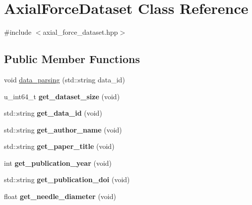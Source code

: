 \hypertarget{classAxialForceDataset}{}\section{Axial\+Force\+Dataset Class Reference}
\label{classAxialForceDataset}


{\ttfamily \#include $<$axial\+\_\+force\+\_\+dataset.\+hpp$>$}

\subsection*{Public Member Functions}
\begin{DoxyCompactItemize}
\item 
void \hyperlink{classAxialForceDataset_a603fe9e768304f3aa7bd9dc32ab34853}{data\+\_\+parsing} (std\+::string data\+\_\+id)
\item 
\mbox{\label{classAxialForceDataset_a99bffcf97bc3ebe61fe4412bf3ed071d}} 
u\+\_\+int64\+\_\+t {\bfseries get\+\_\+dataset\+\_\+size} (void)
\item 
\mbox{\label{classAxialForceDataset_a4ab39e8344f42ac182cb4ef8714b5e8c}} 
std\+::string {\bfseries get\+\_\+data\+\_\+id} (void)
\item 
\mbox{\label{classAxialForceDataset_acb3daa13521936529f438e9b97a95f10}} 
std\+::string {\bfseries get\+\_\+author\+\_\+name} (void)
\item 
\mbox{\label{classAxialForceDataset_a77440a4a879bdd99a1a02a7900ac2eda}} 
std\+::string {\bfseries get\+\_\+paper\+\_\+title} (void)
\item 
\mbox{\label{classAxialForceDataset_a238075c7cfdc40aa7b4a09fd958ed309}} 
int {\bfseries get\+\_\+publication\+\_\+year} (void)
\item 
\mbox{\label{classAxialForceDataset_af0aeac931334564a4b22be31421ab01a}} 
std\+::string {\bfseries get\+\_\+publication\+\_\+doi} (void)
\item 
\mbox{\label{classAxialForceDataset_aba728144a5eb6153b9610ad822b295b9}} 
float {\bfseries get\+\_\+needle\+\_\+diameter} (void)

\end{DoxyCompactItemize}
